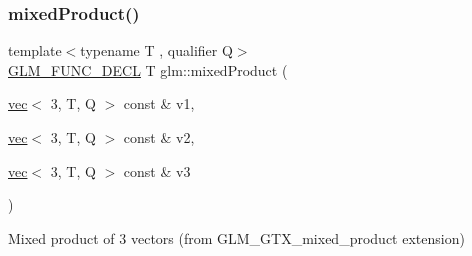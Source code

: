 \subsubsection{\texorpdfstring{mixed\+Product()}{mixedProduct()}}
{\footnotesize\ttfamily template$<$typename T , qualifier Q$>$ \\
\mbox{\hyperlink{setup_8hpp_ab2d052de21a70539923e9bcbf6e83a51}{G\+L\+M\+\_\+\+F\+U\+N\+C\+\_\+\+D\+E\+CL}} T glm\+::mixed\+Product (\begin{DoxyParamCaption}\item[{\mbox{\hyperlink{structglm_1_1vec}{vec}}$<$ 3, T, Q $>$ const \&}]{v1,  }\item[{\mbox{\hyperlink{structglm_1_1vec}{vec}}$<$ 3, T, Q $>$ const \&}]{v2,  }\item[{\mbox{\hyperlink{structglm_1_1vec}{vec}}$<$ 3, T, Q $>$ const \&}]{v3 }\end{DoxyParamCaption})}



Mixed product of 3 vectors (from G\+L\+M\+\_\+\+G\+T\+X\+\_\+mixed\+\_\+product extension) 

